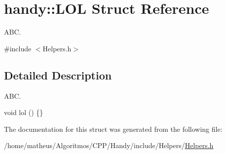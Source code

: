 \hypertarget{structhandy_1_1LOL}{}\section{handy\+:\+:L\+OL Struct Reference}
\label{structhandy_1_1LOL}


A\+BC.  




{\ttfamily \#include $<$Helpers.\+h$>$}



\subsection{Detailed Description}
A\+BC. 


\begin{DoxyCodeInclude}
\textcolor{keywordtype}{void} lol () \{\}
\end{DoxyCodeInclude}


The documentation for this struct was generated from the following file\+:\begin{DoxyCompactItemize}
\item 
/home/matheus/\+Algoritmos/\+C\+P\+P/\+Handy/include/\+Helpers/\hyperlink{Helpers_2Helpers_8h}{Helpers.\+h}\end{DoxyCompactItemize}
